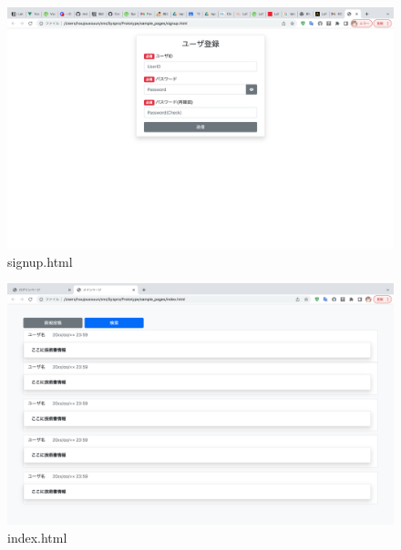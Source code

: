 \documentclass[dvipdfmx]{jsarticle}
\begin{document}
    \begin{figure}[H]
        \begin{center}
            \caption*{signup.html}
            \includegraphics[scale=0.3,clip]{pictures/signup.png}
        \end{center}
    \end{figure}

    \begin{figure}[H]
        \begin{center}
            \caption*{index.html}
            \includegraphics[scale=0.3,clip]{pictures/index.png}
        \end{center}
    \end{figure}
\end{document}
